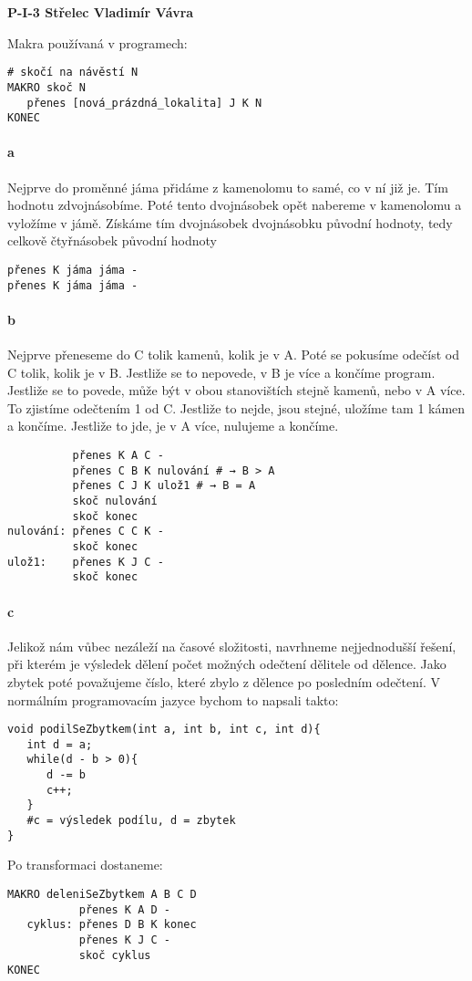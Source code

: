 \documentclass[a4paper,12pt]{article}
\def\author{Vladimír Vávra}
\begin{document}
\pagestyle{plain}
\noindent
\textbf{P-I-3 Střelec \hfill \author}
\vspace{0.5cm}

\noindent Makra používaná v programech:
\begin{verbatim}
# skočí na návěstí N
MAKRO skoč N
   přenes [nová_prázdná_lokalita] J K N
KONEC
\end{verbatim}

\paragraph{a} Nejprve do proměnné jáma přidáme z kamenolomu to samé, co v ní již je. Tím hodnotu zdvojnásobíme. Poté tento dvojnásobek opět nabereme v kamenolomu a vyložíme v jámě. Získáme tím dvojnásobek dvojnásobku původní hodnoty, tedy celkově čtyřnásobek původní hodnoty
\noindent
\begin{verbatim}
přenes K jáma jáma -
přenes K jáma jáma -
\end{verbatim}
\paragraph{b} Nejprve přeneseme do C tolik kamenů, kolik je v A. Poté se pokusíme odečíst od C tolik, kolik je v B. Jestliže se to nepovede, v B je více a končíme program. Jestliže se to povede, může být v obou stanovištích stejně kamenů, nebo v A více. To zjistíme odečtením 1 od C. Jestliže to nejde, jsou stejné, uložíme tam 1 kámen a končíme. Jestliže to jde, je v A více, nulujeme a končíme. 
\begin{verbatim}
          přenes K A C -
          přenes C B K nulování # → B > A
          přenes C J K ulož1 # → B = A
          skoč nulování
          skoč konec
nulování: přenes C C K -
          skoč konec
ulož1:    přenes K J C -
          skoč konec
\end{verbatim}
\paragraph{c} Jelikož nám vůbec nezáleží na časové složitosti, navrhneme nejjednodušší řešení, při kterém je výsledek dělení počet možných odečtení dělitele od dělence. Jako zbytek poté považujeme číslo, které zbylo z dělence po posledním odečtení. V normálním programovacím jazyce bychom to napsali takto:
\begin{verbatim}
void podilSeZbytkem(int a, int b, int c, int d){
   int d = a;
   while(d - b > 0){
      d -= b
      c++;
   }
   #c = výsledek podílu, d = zbytek
}
\end{verbatim}
Po transformaci dostaneme: 
\begin{verbatim}
MAKRO deleniSeZbytkem A B C D
           přenes K A D -
   cyklus: přenes D B K konec
           přenes K J C -
           skoč cyklus
KONEC
\end{verbatim}
\end{document}
